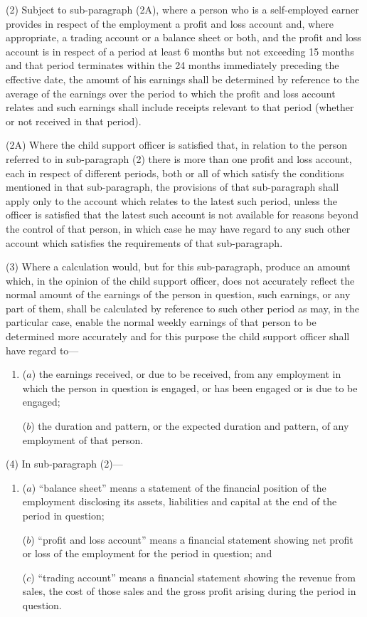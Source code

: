 \documentclass[a4paper]{article}
\begin{document}
(2) 
Subject to sub-paragraph (2A), where  %
a person who is a self-employed earner provides in respect of the employment a profit and loss account and, where appropriate, a trading account or a balance sheet or both, and the profit and loss account is in respect of a period at least 6 months but not exceeding 15 months and that period terminates within the 
24 months  %
immediately preceding the effective date, the amount of his earnings shall be determined by reference to the average of the earnings over the period to which the profit and loss account relates and such earnings shall include receipts relevant to that period (whether or not received in that period).

(2A) Where the child support officer is satisfied that, in relation to the person referred to in sub-paragraph (2) there is more than one profit and loss account, each in respect of different periods, both or all of which satisfy the conditions mentioned in that sub-paragraph, the provisions of that sub-paragraph shall apply only to the account which relates to the latest such period, unless the officer is satisfied that the latest such account is not available for reasons beyond the control of that person, in which case he may have regard to any such other account which satisfies the requirements of that sub-paragraph.

(3) Where a calculation would, but for this sub-paragraph, produce an amount which, in the opinion of the child support officer, does not accurately reflect the normal amount of the earnings of the person in question, such earnings, or any part of them, shall be calculated by reference to such other period as may, in the particular case, enable the normal weekly earnings of that person to be determined more accurately and for this purpose the child support officer shall have regard to—
\begin{enumerate}\item[]
($a$) the earnings received, or due to be received, from any employment in which the person in question is engaged, or has been engaged or is due to be engaged;

($b$) the duration and pattern, or the expected duration and pattern, of any employment of that person.
\end{enumerate}

(4) In sub-paragraph (2)—
\begin{enumerate}\item[]
($a$) “balance sheet” means a statement of the financial position of the employment disclosing its assets, liabilities and capital at the end of the period in question;

($b$) “profit and loss account” means a financial statement showing net profit or loss of the employment for the period in question; and

($c$) “trading account” means a financial statement showing the revenue from sales, the cost of those sales and the gross profit arising during the period in question.
\end{enumerate}
\end{document}
